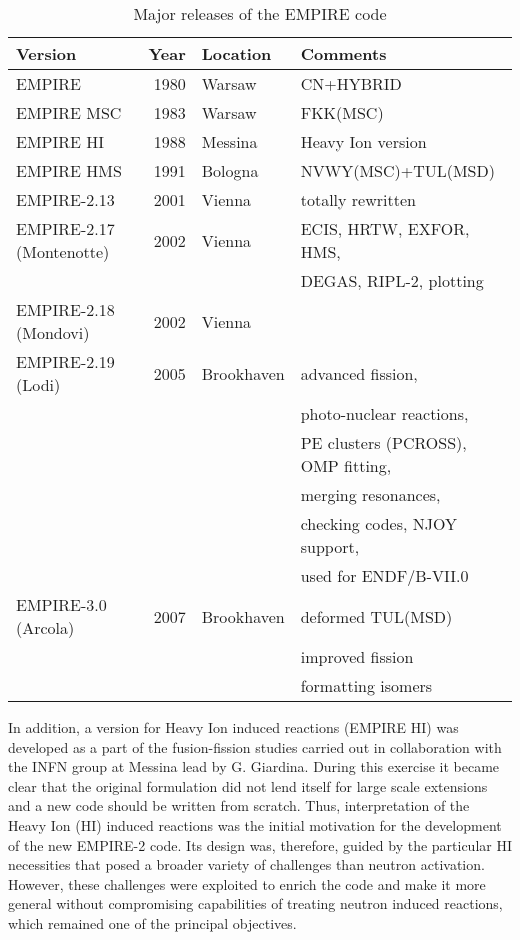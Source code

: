 \begin{table*}[tbp]
\caption{Major releases of the EMPIRE code}
\label{tab:emp-history}%
\begin{tabular}{lrll}
\hline
\textbf{Version} & \textbf{\ Year } & \textbf{Location} & \textbf{Comments}
\\ \hline
EMPIRE & 1980 & Warsaw & CN+HYBRID \\ 
EMPIRE MSC & 1983 & Warsaw & FKK(MSC) \\ 
EMPIRE HI & 1988 & Messina & Heavy Ion version \\ 
EMPIRE HMS & 1991 & Bologna & NVWY(MSC)+TUL(MSD) \\ 
EMPIRE-2.13 & 2001 & Vienna & totally rewritten \\ 
EMPIRE-2.17 (Montenotte) & 2002 & Vienna & ECIS, HRTW, EXFOR, HMS, \\ 
&  &  & DEGAS, RIPL-2, plotting \\ 
EMPIRE-2.18 (Mondovi) & 2002 & Vienna &  \\ 
EMPIRE-2.19 (Lodi) & 2005 & Brookhaven & advanced fission, \\ 
&  &  & photo-nuclear reactions, \\ 
&  &  & PE clusters (PCROSS), OMP fitting, \\ 
&  &  & merging resonances, \\ 
&  &  & checking codes, NJOY support, \\ 
&  &  & used for ENDF/B-VII.0 \\ 
EMPIRE-3.0 (Arcola) & 2007 & Brookhaven & deformed TUL(MSD) \\ 
&  &  & improved fission \\ 
&  &  & formatting isomers \\ \hline
\end{tabular}%
\end{table*}

In addition, a version for Heavy Ion induced reactions (EMPIRE HI) was
developed as a part of the fusion-fission studies carried out in
collaboration with the INFN group at Messina lead by G. Giardina. During
this exercise it became clear that the original formulation did not lend
itself for large scale extensions and a new code should be written from
scratch. Thus, interpretation of the Heavy Ion (HI) induced reactions was
the initial motivation for the development of the new EMPIRE-2 code. Its
design was, therefore, guided by the particular HI necessities that posed a
broader variety of challenges than neutron activation. However, these
challenges were exploited to enrich the code and make it more general
without compromising capabilities of treating neutron induced reactions,
which remained one of the principal objectives.


